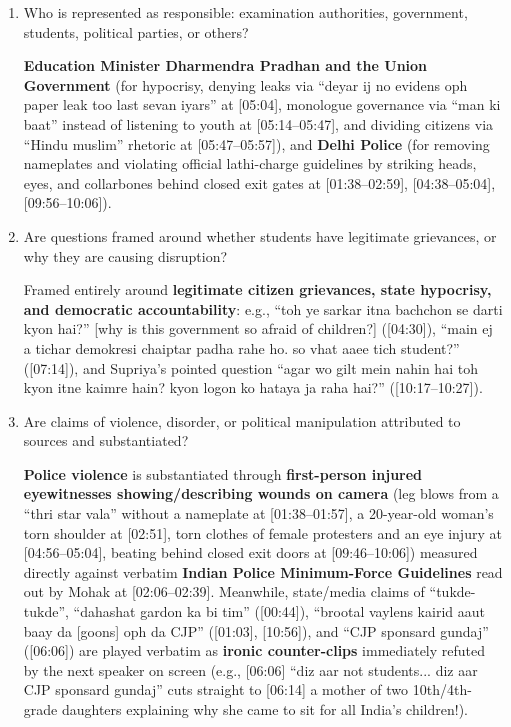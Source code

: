 \documentclass[10pt,a4paper]{article}
\begin{document}
{\begin{enumerate}[leftmargin=1.5em, itemsep=6pt, topsep=4pt]
  \item Who is represented as responsible: examination authorities, government, students, political parties, or others?\par\smallskip
  \textbf{Education Minister Dharmendra Pradhan and the Union Government} (for hypocrisy, denying leaks via ``deyar ij no evidens oph paper leak too last sevan iyars'' at [05:04], monologue governance via ``man ki baat'' instead of listening to youth at [05:14--05:47], and dividing citizens via ``Hindu muslim'' rhetoric at [05:47--05:57]), and \textbf{Delhi Police} (for removing nameplates and violating official lathi-charge guidelines by striking heads, eyes, and collarbones behind closed exit gates at [01:38--02:59], [04:38--05:04], [09:56--10:06]).
  \item Are questions framed around whether students have legitimate grievances, or why they are causing disruption?\par\smallskip
  Framed entirely around \textbf{legitimate citizen grievances, state hypocrisy, and democratic accountability}: e.g., ``toh ye sarkar itna bachchon se darti kyon hai?'' [why is this government so afraid of children?] ([04:30]), ``main ej a tichar demokresi chaiptar padha rahe ho. so vhat aaee tich student?'' ([07:14]), and Supriya's pointed question ``agar wo gilt mein nahin hai toh kyon itne kaimre hain? kyon logon ko hataya ja raha hai?'' ([10:17--10:27]).
  \item Are claims of violence, disorder, or political manipulation attributed to sources and substantiated?\par\smallskip
  \textbf{Police violence} is substantiated through \textbf{first-person injured eyewitnesses showing/describing wounds on camera} (leg blows from a ``thri star vala'' without a nameplate at [01:38--01:57], a 20-year-old woman's torn shoulder at [02:51], torn clothes of female protesters and an eye injury at [04:56--05:04], beating behind closed exit doors at [09:46--10:06]) measured directly against verbatim \textbf{Indian Police Minimum-Force Guidelines} read out by Mohak at [02:06--02:39]. Meanwhile, state/media claims of ``tukde-tukde'', ``dahashat gardon ka bi tim'' ([00:44]), ``brootal vaylens kairid aaut baay da [goons] oph da CJP'' ([01:03], [10:56]), and ``CJP sponsard gundaj'' ([06:06]) are played verbatim as \textbf{ironic counter-clips} immediately refuted by the next speaker on screen (e.g., [06:06] ``diz aar not students... diz aar CJP sponsard gundaj'' cuts straight to [06:14] a mother of two 10th/4th-grade daughters explaining why she came to sit for all India's children!).

\end{enumerate}}
\end{document}
